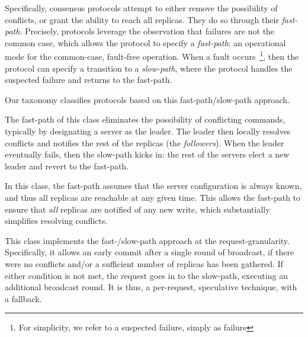 \begin{comment}
However, this solution has a direct implication on performance: protocol specifications can not enforce the invariant that a broadcast message reaches all replicas. This handicap presents a challenge in designing high-performance protocols, seeing as \emph{in the face of conflicting consensus commands, %
the ability to reach all replicas is crucial.}
\end{comment}

Specifically, consensus protocols attempt to either remove the possibility of conflicts, or grant the ability to reach all replicas. They do so through their \emph{fast-path}. Precisely,
protocols leverage the observation that failures are not the common case, which allows the protocol to specify a \emph{fast-path}: an operational mode for the common-case, fault-free operation. 
When a fault occurs~\footnote{ For simplicity, we refer to a suspected failure, simply as failure},
then the protocol can specify a transition to a \emph{slow-path}, where the protocol handles the suspected failure and returns to the fast-path.

\custvspace
\noindent Our taxonomy classifies protocols based on this fast-path/slow-path approach. 



The fast-path of this class eliminates the possibility of conflicting commands, typically by designating a server as the leader. The leader then locally resolves conflicts and notifies the rest of the replicas (\ie the \emph{followers}). When the leader eventually fails, then the slow-path kicks in: the rest of the servers elect a new leader and revert to the fast-path. 

In this class, the fast-path assumes that the server configuration is always known, and thus all replicas are reachable at any given time. This allows the fast-path to ensure that \emph{all} replicas are notified of any new write, which substantially simplifies resolving conflicts.

This class implements the fast-/slow-path approach at the request-granularity. Specifically, it allows an early commit after a single round of broadcast, if there were no conflicts and/or a sufficient number of replicas has been gathered.
If either condition is not met, the request goes in to the slow-path, executing an additional broadcast round. It is thus, a per-request, speculative technique, with a fallback. 

